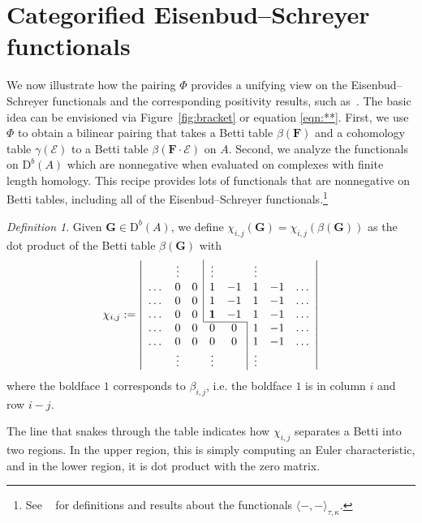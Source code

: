 \documentclass[12pt]{amsart}
\theoremstyle{definition}
\theoremstyle{remark}
\newtheorem{defn}[lemma]{Definition}
\newcommand{\cE}{\mathcal{E}}
\newcommand{\FF}{\mathbf{F}}
\newcommand{\Gbull}{\mathbf{G}}
\newcommand{\DD}{\mathrm{D}}
\begin{document}
\section{Categorified Eisenbud--Schreyer functionals}\label{sec:functionals}
We now illustrate how the pairing $\Phi$ provides a unifying view on the Eisenbud--Schreyer functionals and  the corresponding positivity results, such as~\cite[Positivity 1 and 2]{eis-schrey-icm}.  The basic idea can be envisioned via Figure~\ref{fig:bracket} or equation \eqref{eqn:**}.  First, we use $\Phi$ to obtain a  bilinear pairing that takes a Betti table $\beta(\FF)$ and a cohomology table $\gamma(\cE)$ to a Betti table $\beta(\FF\cdot \cE)$ on $A$.  Second, we analyze the functionals on $\DD^b(A)$ which are nonnegative when evaluated on complexes with finite length homology.  
This recipe provides lots of functionals that are nonnegative on Betti tables, including all of the Eisenbud--Schreyer functionals.\footnote{See ~\cite{eis-schrey-icm} for definitions and results about the functionals $\langle -, -\rangle_{\tau,\kappa}$.}


\begin{defn}\label{defn:chi}
Given $\Gbull\in \DD^b(A)$, we define $\chi_{i,j}(\Gbull)=\chi_{i,j}(\beta(\Gbull))$ as the dot product of the Betti table $\beta(\Gbull)$ with
\begin{equation}\label{eqn:chi}
\chi_{i,j}:=
\left|
\begin{array}{cccccccc}
 & \vdots& &\multicolumn{1}{|c}{\vdots}&& \vdots&&\\
\dots&0&0&\multicolumn{1}{|c}{1}&-1&1&-1&\dots\\
\dots&0&0&\multicolumn{1}{|c}{1}&-1&1&-1&\dots\\
\dots&0&0&\multicolumn{1}{|c}{\mathbf{1}}&-1&1&-1&\dots\\ \cline{4-5}
\dots&0&0&0&0&\multicolumn{1}{|c}{1}&-1&\dots\\
\dots&0&0&0&0&\multicolumn{1}{|c}{1}&-1&\dots\\
& \vdots&&\vdots&& \multicolumn{1}{|c}{\vdots}&&\\
\end{array}
\right|
\end{equation}
where the boldface $1$ corresponds to $\beta_{i,j}$, i.e. the boldface $1$ is in column $i$ and row $i-j$. 
\end{defn}
The line that snakes through
the table indicates how $\chi_{i,j}$ separates a Betti into two regions.  In the upper region, this is simply computing an Euler characteristic, and in the lower region, it is dot product with the zero matrix.  
\end{document}
